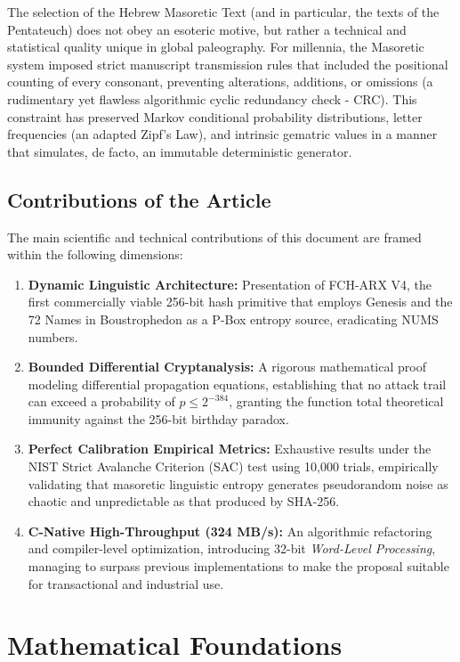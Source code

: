 \documentclass[10pt,journal,compsoc]{IEEEtran}
\begin{document}
The selection of the Hebrew Masoretic Text (and in particular, the texts of the Pentateuch) does not obey an esoteric motive, but rather a technical and statistical quality unique in global paleography. For millennia, the Masoretic system imposed strict manuscript transmission rules that included the positional counting of every consonant, preventing alterations, additions, or omissions (a rudimentary yet flawless algorithmic cyclic redundancy check - CRC). This constraint has preserved Markov conditional probability distributions, letter frequencies (an adapted Zipf's Law), and intrinsic gematric values in a manner that simulates, de facto, an immutable deterministic generator.

\subsection{Contributions of the Article}
The main scientific and technical contributions of this document are framed within the following dimensions:
\begin{enumerate}
    \item \textbf{Dynamic Linguistic Architecture:} Presentation of FCH-ARX V4, the first commercially viable 256-bit hash primitive that employs Genesis and the 72 Names in Boustrophedon as a P-Box entropy source, eradicating NUMS numbers.
    \item \textbf{Bounded Differential Cryptanalysis:} A rigorous mathematical proof modeling differential propagation equations, establishing that no attack trail can exceed a probability of $p \leq 2^{-384}$, granting the function total theoretical immunity against the 256-bit birthday paradox.
    \item \textbf{Perfect Calibration Empirical Metrics:} Exhaustive results under the NIST Strict Avalanche Criterion (SAC) test using 10,000 trials, empirically validating that masoretic linguistic entropy generates pseudorandom noise as chaotic and unpredictable as that produced by SHA-256.
    \item \textbf{C-Native High-Throughput (324 MB/s):} An algorithmic refactoring and compiler-level optimization, introducing 32-bit \textit{Word-Level Processing}, managing to surpass previous implementations to make the proposal suitable for transactional and industrial use.
\end{enumerate}

\section{Mathematical Foundations}
\end{document}
